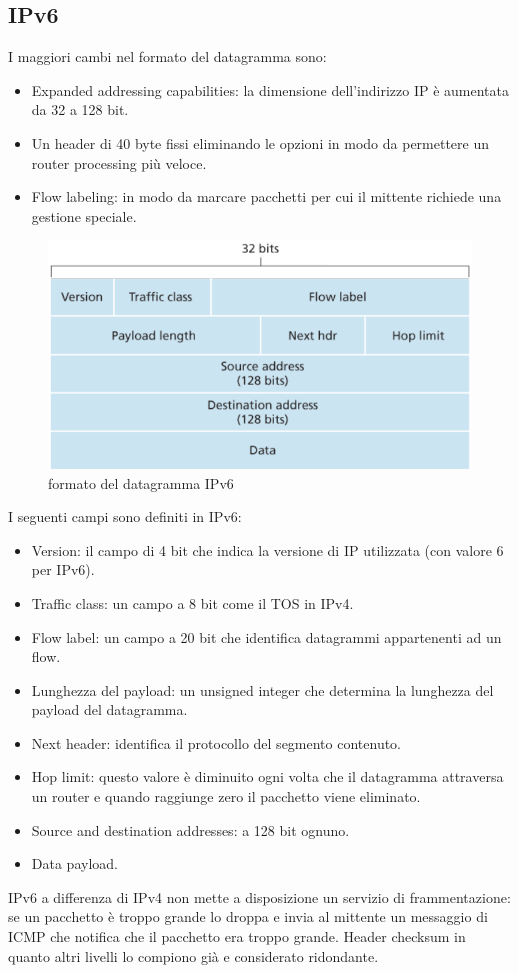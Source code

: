 \subsection{IPv6}
I maggiori cambi nel formato del datagramma sono:
\begin{itemize}
\item Expanded addressing capabilities: la dimensione dell'indirizzo IP \`e aumentata da 32 a 128 bit. 
\item Un header di 40 byte fissi eliminando le opzioni in modo da permettere un router processing pi\`u veloce.
\item Flow labeling: in modo da marcare pacchetti per cui il mittente richiede una gestione speciale. 
\end{itemize}
\begin{figure}[h]
\includegraphics[width=\textwidth]{Pictures/IPv6Datagram.png}
\caption{formato del datagramma IPv6}
\end{figure}
I seguenti campi sono definiti in IPv6:
\begin{itemize}
\item Version: il campo di 4 bit che indica la versione di IP utilizzata (con valore 6 per IPv6).
\item Traffic class: un campo a 8 bit come il TOS in IPv4.
\item Flow label: un campo a 20 bit che identifica datagrammi appartenenti ad un flow.
\item Lunghezza del payload: un unsigned integer che determina la lunghezza del payload del datagramma. 
\item Next header: identifica il protocollo del segmento contenuto.
\item Hop limit: questo valore \`e diminuito ogni volta che il datagramma attraversa un router e quando raggiunge zero il pacchetto viene eliminato.
\item Source and destination addresses: a 128 bit ognuno.
\item Data payload.
\end{itemize}
IPv6 a differenza di IPv4 non mette a disposizione un servizio di frammentazione: se un pacchetto \`e troppo grande lo droppa e invia al mittente un 
messaggio di ICMP che notifica che il pacchetto era troppo grande. Header checksum in quanto altri livelli lo compiono gi\`a e considerato ridondante. 
